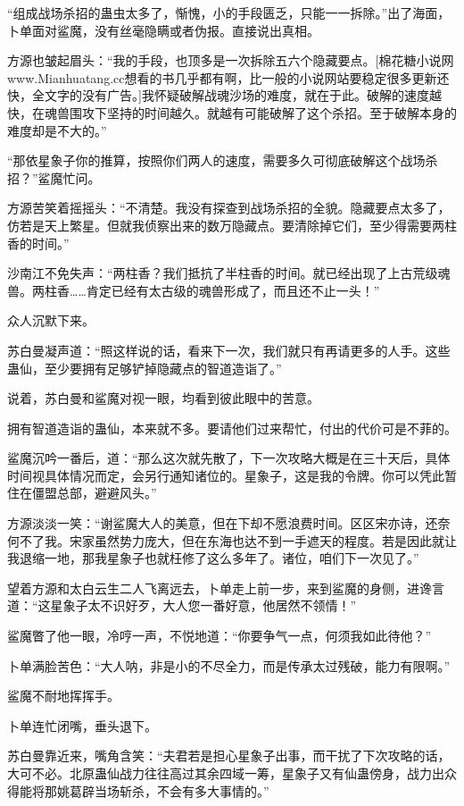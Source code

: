 \begin{this_body}
“组成战场杀招的蛊虫太多了，惭愧，小的手段匮乏，只能一一拆除。”出了海面，卜单面对鲨魔，没有丝毫隐瞒或者伪报。直接说出真相。

方源也皱起眉头：“我的手段，也顶多是一次拆除五六个隐藏要点。[棉花糖小说网www.Mianhuatang.cc想看的书几乎都有啊，比一般的小说网站要稳定很多更新还快，全文字的没有广告。]我怀疑破解战魂沙场的难度，就在于此。破解的速度越快，在魂兽围攻下坚持的时间越久。就越有可能破解了这个杀招。至于破解本身的难度却是不大的。”

“那依星象子你的推算，按照你们两人的速度，需要多久可彻底破解这个战场杀招？”鲨魔忙问。

方源苦笑着摇摇头：“不清楚。我没有探查到战场杀招的全貌。隐藏要点太多了，仿若是天上繁星。但就我侦察出来的数万隐藏点。要清除掉它们，至少得需要两柱香的时间。”

沙南江不免失声：“两柱香？我们抵抗了半柱香的时间。就已经出现了上古荒级魂兽。两柱香……肯定已经有太古级的魂兽形成了，而且还不止一头！”

众人沉默下来。

苏白曼凝声道：“照这样说的话，看来下一次，我们就只有再请更多的人手。这些蛊仙，至少要拥有足够铲掉隐藏点的智道造诣了。”

说着，苏白曼和鲨魔对视一眼，均看到彼此眼中的苦意。

拥有智道造诣的蛊仙，本来就不多。要请他们过来帮忙，付出的代价可是不菲的。

鲨魔沉吟一番后，道：“那么这次就先散了，下一次攻略大概是在三十天后，具体时间视具体情况而定，会另行通知诸位的。星象子，这是我的令牌。你可以凭此暂住在僵盟总部，避避风头。”

方源淡淡一笑：“谢鲨魔大人的美意，但在下却不愿浪费时间。区区宋亦诗，还奈何不了我。宋家虽然势力庞大，但在东海也达不到一手遮天的程度。若是因此就让我退缩一地，那我星象子也就枉修了这么多年了。诸位，咱们下一次见了。”

望着方源和太白云生二人飞离远去，卜单走上前一步，来到鲨魔的身侧，进谗言道：“这星象子太不识好歹，大人您一番好意，他居然不领情！”

鲨魔瞥了他一眼，冷哼一声，不悦地道：“你要争气一点，何须我如此待他？”

卜单满脸苦色：“大人呐，非是小的不尽全力，而是传承太过残破，能力有限啊。”

鲨魔不耐地挥挥手。

卜单连忙闭嘴，垂头退下。

苏白曼靠近来，嘴角含笑：“夫君若是担心星象子出事，而干扰了下次攻略的话，大可不必。北原蛊仙战力往往高过其余四域一筹，星象子又有仙蛊傍身，战力出众得能将那姚葛辟当场斩杀，不会有多大事情的。”


\end{this_body}
